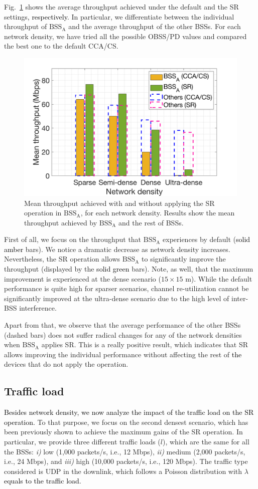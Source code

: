 \documentclass[preprint,12pt]{elsarticle}
\begin{document}
Fig.~\ref{fig:SIM_2_1} shows the average throughput achieved under the default and the SR settings\textcolor{black}{, respectively}. In particular, we differentiate between the individual throughput of $\text{BSS}_\text{A}$ and the average throughput of the other BSSs. For each network density, we have tried all the possible OBSS/PD values and compared the best one to the default CCA/CS.

\begin{figure}[ht!]
	\centering		
	\includegraphics[width=.48\columnwidth]{SIM_2_1}
	\caption{Mean throughput achieved with and without applying the SR operation in $\text{BSS}_\text{A}$, for each network density. Results show the mean throughput achieved by $\text{BSS}_\text{A}$ and the rest of BSSs.}
	\label{fig:SIM_2_1}
\end{figure}

First of all, we focus on the throughput that $\text{BSS}_\text{A}$ experiences by default (\textcolor{black}{solid amber} bars). We notice a dramatic decrease as network density increases. Nevertheless, the SR operation allows $\text{BSS}_\text{A}$ to significantly improve the throughput (displayed by the \textcolor{black}{solid green} bars). Note, as well, that the maximum improvement is experienced at the dense scenario ($15\times15$ m). While the default performance is quite high for sparser scenarios, channel re-utilization cannot be significantly improved at the ultra-dense scenario due to the high level of inter-BSS interference.

Apart from that, we observe that the average performance of the other BSSs (dashed bars) does not suffer radical changes for any of the network densities when $\text{BSS}_\text{A}$ applies SR. This is a really positive result, which indicates that SR allows improving the individual performance without affecting the rest of \textcolor{black}{the} devices that do not apply the operation.

\subsection{Traffic load}
\label{section:random_scenarios_traffic_load}
\textcolor{black}{Besides network density, we now analyze the impact of the traffic load on the SR operation.} To that purpose, we focus on the second densest scenario, which has been previously shown to achieve the maximum gains of the SR operation. In particular, we provide three different traffic loads ($l$), which are the same for all the BSSs: \emph{i)} low (1,000 packets/s, i.e., 12 Mbps), \emph{ii)} medium (2,000 packets/s, i.e., 24 Mbps), and \emph{iii)} high (10,000 packets/s, i.e., 120 Mbps). The traffic type considered is UDP in the downlink, which follows a Poisson distribution with $\lambda$ \textcolor{black}{equals to the traffic load.}
\end{document}
